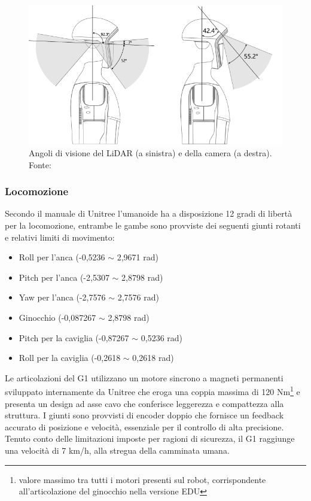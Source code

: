\begin{figure}[h]
    \centering
    \includegraphics[width=0.5\linewidth]{immagini/sensori_g1.png}
    \caption{Angoli di visione del LiDAR (a sinistra) e della camera (a destra). Fonte: \cite{unitreeManual2025}}
    \label{fig:sensori_g1}
\end{figure}


\subsubsection{Locomozione}
Secondo il manuale di Unitree \cite{unitreeManual2025} l'umanoide ha a disposizione 12 gradi di libertà per la locomozione, entrambe le gambe sono provviste dei seguenti giunti rotanti e relativi limiti di movimento:

\begin{itemize}
    \item Roll per l'anca (-0,5236 $\sim$ 2,9671 rad)
    \item Pitch per l'anca (-2,5307 $\sim$ 2,8798 rad)
    \item Yaw per l'anca (-2,7576 $\sim$ 2,7576 rad)
    \item Ginocchio (-0,087267 $\sim$ 2,8798 rad)
    \item Pitch per la caviglia (-0,87267 $\sim$ 0,5236 rad)
    \item Roll per la caviglia (-0,2618 $\sim$ 0,2618 rad)
\end{itemize}

Le articolazioni del G1 utilizzano un motore sincrono a magneti permanenti sviluppato internamente da Unitree che eroga una coppia massima di 120 Nm\footnote{valore massimo tra tutti i motori presenti sul robot, corrispondente all'articolazione del ginocchio nella versione EDU} e presenta un design ad asse cavo che conferisce leggerezza e compattezza alla struttura. I giunti sono provvisti di encoder doppio che fornisce un feedback accurato di posizione e velocità, essenziale per il controllo di alta precisione. Tenuto conto delle limitazioni imposte per ragioni di sicurezza, il G1 raggiunge una velocità di 7 km/h, alla stregua della camminata umana.
